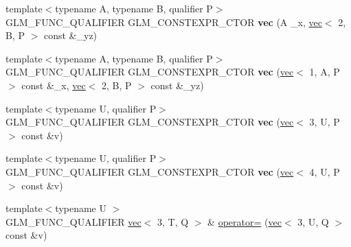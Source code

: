 \begin{DoxyCompactItemize}
\mbox{\label{structglm_1_1vec_3_013_00_01T_00_01Q_01_4_a901f1c696deb619cbd26555bc7b08513}} 
{\footnotesize template$<$typename A, typename B, qualifier P$>$ }\\G\+L\+M\+\_\+\+F\+U\+N\+C\+\_\+\+Q\+U\+A\+L\+I\+F\+I\+ER G\+L\+M\+\_\+\+C\+O\+N\+S\+T\+E\+X\+P\+R\+\_\+\+C\+T\+OR {\bfseries vec} (A \+\_\+x, \hyperlink{structglm_1_1vec}{vec}$<$ 2, B, P $>$ const \&\+\_\+yz)
\item 
\mbox{\label{structglm_1_1vec_3_013_00_01T_00_01Q_01_4_a1f6418de9fddeaf4b97c9743808b3496}} 
{\footnotesize template$<$typename A, typename B, qualifier P$>$ }\\G\+L\+M\+\_\+\+F\+U\+N\+C\+\_\+\+Q\+U\+A\+L\+I\+F\+I\+ER G\+L\+M\+\_\+\+C\+O\+N\+S\+T\+E\+X\+P\+R\+\_\+\+C\+T\+OR {\bfseries vec} (\hyperlink{structglm_1_1vec}{vec}$<$ 1, A, P $>$ const \&\+\_\+x, \hyperlink{structglm_1_1vec}{vec}$<$ 2, B, P $>$ const \&\+\_\+yz)
\item 
\mbox{\label{structglm_1_1vec_3_013_00_01T_00_01Q_01_4_a9f3cdc2f03db0bc50512e16a64cdb4aa}} 
{\footnotesize template$<$typename U, qualifier P$>$ }\\G\+L\+M\+\_\+\+F\+U\+N\+C\+\_\+\+Q\+U\+A\+L\+I\+F\+I\+ER G\+L\+M\+\_\+\+C\+O\+N\+S\+T\+E\+X\+P\+R\+\_\+\+C\+T\+OR {\bfseries vec} (\hyperlink{structglm_1_1vec}{vec}$<$ 3, U, P $>$ const \&v)
\item 
\mbox{\label{structglm_1_1vec_3_013_00_01T_00_01Q_01_4_a71c4b9fad3b06926109f1f8fa74f6064}} 
{\footnotesize template$<$typename U, qualifier P$>$ }\\G\+L\+M\+\_\+\+F\+U\+N\+C\+\_\+\+Q\+U\+A\+L\+I\+F\+I\+ER G\+L\+M\+\_\+\+C\+O\+N\+S\+T\+E\+X\+P\+R\+\_\+\+C\+T\+OR {\bfseries vec} (\hyperlink{structglm_1_1vec}{vec}$<$ 4, U, P $>$ const \&v)
\item 
\mbox{\label{structglm_1_1vec_3_013_00_01T_00_01Q_01_4_a0a2d90044067dfb3ec8bf457f9a8e054}} 
{\footnotesize template$<$typename U $>$ }\\G\+L\+M\+\_\+\+F\+U\+N\+C\+\_\+\+Q\+U\+A\+L\+I\+F\+I\+ER \hyperlink{structglm_1_1vec}{vec}$<$ 3, T, Q $>$ \& \hyperlink{structglm_1_1vec_3_013_00_01T_00_01Q_01_4_a0a2d90044067dfb3ec8bf457f9a8e054}{operator=} (\hyperlink{structglm_1_1vec}{vec}$<$ 3, U, Q $>$ const \&v)

\end{DoxyCompactItemize}

